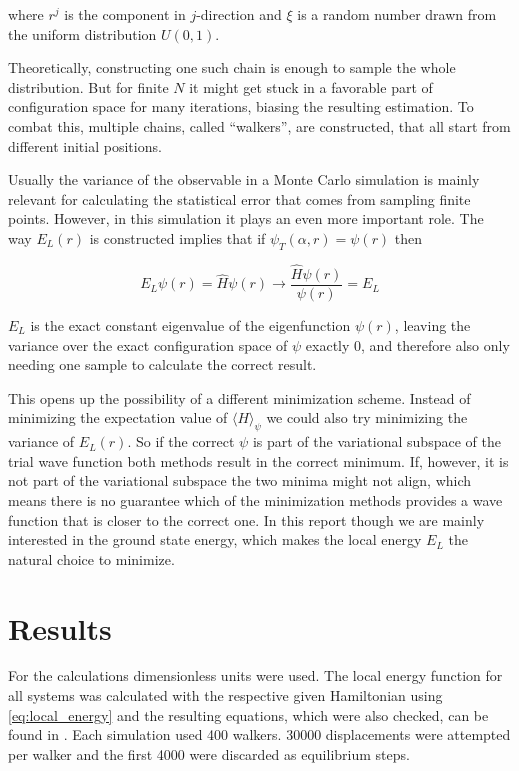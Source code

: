 \documentclass[a4paper, 11pt]{article}          %
\begin{document}
    where $r^j$ is the component in $j$-direction and $\xi$ is a random number drawn from the uniform distribution $U(0,1)$.

    Theoretically, constructing one such chain is enough to sample the whole distribution. But for finite $N$ it might get stuck in a favorable part of configuration space for many iterations, biasing the resulting estimation. To combat this, multiple chains, called ``walkers'', are constructed, that all start from different initial positions.

    Usually the variance of the observable in a Monte Carlo simulation is mainly relevant for calculating the statistical error that comes from sampling finite points. However, in this simulation it plays an even more important role. The way $E_L(r)$ is constructed implies that if $\psi_T(\alpha, r) = \psi(r)$ then

    \begin{equation*}
        E_L \psi(r) = \hat{H} \psi(r) \rightarrow \frac{\hat{H}\psi(r)}{\psi(r)} = E_L
    \end{equation*}

    $E_L$ is the exact constant eigenvalue of the eigenfunction $\psi(r)$, leaving the variance over the exact configuration space of $\psi$ exactly 0, and therefore also only needing one sample to calculate the correct result.

    This opens up the possibility of a different minimization scheme. Instead of minimizing the expectation value of $\langle H \rangle_\psi$ we could also try minimizing the variance of $E_L(r)$. So if the correct $\psi$ is part of the variational subspace of the trial wave function both methods result in the correct minimum. If, however, it is not part of the variational subspace the two minima might not align, which means there is no guarantee which of the minimization methods provides a wave function that is closer to the correct one. In this report though we are mainly interested in the ground state energy, which makes the local energy $E_L$ the natural choice to minimize.

    \section{Results}

    For the calculations dimensionless units were used. The local energy function for all systems was calculated with the respective given Hamiltonian using \eqref{eq:local_energy} and the resulting equations, which were also checked, can be found in \cite{Thijssen2007}. Each simulation used 400 walkers. 30000 displacements were attempted per walker and the first 4000 were discarded as equilibrium steps.
\end{document}
